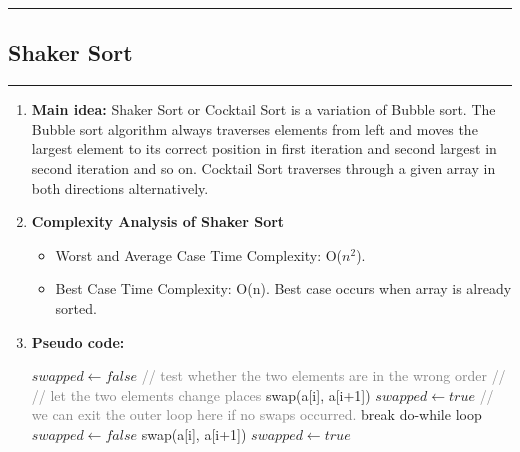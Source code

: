 \documentclass[11pt,a4paper]{article}
\begin{document}
{		\rule{15cm}{0.1cm}
		\subsection{Shaker Sort}
		\rule{15cm}{0.1cm}
			\begin{enumerate}[label=\textbf{\arabic*})]
				\item \textbf{Main idea:}
				Shaker Sort or Cocktail Sort is a variation of Bubble sort. The Bubble sort algorithm always traverses elements from left and moves the largest element to its correct position in first iteration and second largest in second iteration and so on. Cocktail Sort traverses through a given array in both directions alternatively. 
				\\[12pt]
				\item \textbf{Complexity Analysis of Shaker Sort}
				\begin{itemize}
				    \item Worst and Average Case Time Complexity: O($n^2$). 
                    \item Best Case Time Complexity: O(n). Best case occurs when array is already sorted.
				\end{itemize}   
				\item \textbf{Pseudo code:} 
				\begin{algorithm}[H]
            	\begin{algorithmic}[1]
            			\Do
            				\State $swapped \gets false$
            					\State \textcolor{gray}{// test whether the two elements are in the wrong order}
            						\State \textcolor{gray}{// // let the two elements change places}
            						\State swap(a[i], a[i+1])
            						\State $swapped \gets true$
            					\EndIf
            				\EndFor
            					\State \textcolor{Gray}{// we can exit the outer loop here if no swaps occurred.}
            					\State break do-while loop
            				\EndIf
            				\State $swapped \gets false$
            						\State swap(a[i], a[i+1])
            						\State $swapped \gets true$
            					\EndIf
            				\EndFor
            			 \Comment{\textcolor{Gray}{// if no elements have been swapped, then the list is sorted}}
            		\EndProcedure
            	\end{algorithmic}

\end{algorithm}
\end{enumerate}}
\end{document}
